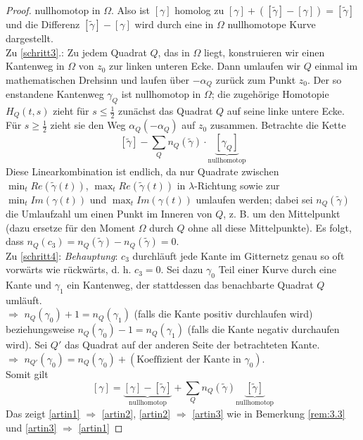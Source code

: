 \documentclass[11pt,titlepage]{article}
\theoremstyle{definition}
\theoremstyle{remark}
\begin{document}
\begin{proof}
		nullhomotop in $\Omega$. Also ist $[\gamma]$ homolog zu $[\gamma]+([\tilde{\gamma}]-[\gamma])= 
		[\tilde{\gamma}]$ und die Differenz $[\tilde{\gamma}]-[\gamma]$ wird durch eine in $\Omega$ 
		nullhomotope Kurve dargestellt. \\
		Zu \ref{schritt3}.: Zu jedem Quadrat $Q$, das in $\Omega$ liegt, konstruieren wir einen Kantenweg in $
		\Omega$ von $z_0$ zur linken unteren Ecke. Dann umlaufen wir $Q$ einmal im mathematischen 
		Drehsinn und laufen über $-\alpha_Q$ zurück zum Punkt $z_0$. Der so enstandene Kantenweg 
		$\gamma_Q$ ist nullhomotop in $\Omega$; die zugehörige Homotopie $H_Q(t,s)$ zieht für 
		$s\leq\frac{1}{2}$ zunächst das Quadrat $Q$ auf seine linke untere Ecke. Für $s\geq \frac{1}{2}$ 
		zieht sie den Weg $\alpha_Q (-\alpha_Q)$ auf $z_0$ zusammen. Betrachte die Kette 
		\[ [\tilde{\gamma}]-\sum_Q n_Q (\tilde{\gamma})\cdot \underbrace{[\gamma_Q]}_{\text{nullhomotop}} \]
		Diese Linearkombination ist endlich, da nur Quadrate zwischen $\min_t Re(\tilde{\gamma}(t))$, 
		$\max_t Re(\tilde{\gamma}(t))$ in $\lambda$-Richtung sowie zur $\min_t Im(\gamma(t))$ und 
		$\max_t Im(\gamma(t))$ umlaufen werden; dabei sei $n_Q(\tilde{\gamma})$ die Umlaufzahl 
		um einen Punkt im Inneren von $Q$, z. B. um den Mittelpunkt (dazu ersetze für den Moment 
		$\Omega$ durch $Q$ ohne all diese Mittelpunkte). Es folgt, dass $n_Q (c_3)=n_Q(\tilde{\gamma})-
		n_Q(\tilde{\gamma})=0$. \\
		Zu \ref{schritt4}: \textsl{Behauptung}: $c_3$ durchläuft jede Kante im Gitternetz genau so oft 
		vorwärts wie rückwärts, d. h. $c_3=0$. Sei dazu $\gamma_0$ Teil einer Kurve durch eine Kante und 
		$\gamma_1$ ein Kantenweg, der stattdessen das benachbarte Quadrat $Q$ umläuft. \\
		$\Rightarrow$ $n_Q(\gamma_0)+1=n_Q(\gamma_1)$ (falls die Kante positiv durchlaufen wird) 
		beziehungsweise $n_Q(\gamma_0)-1=n_Q(\gamma_1)$ (falls die Kante negativ durchaufen wird).
		Sei $Q'$ das Quadrat auf der anderen Seite der betrachteten Kante. \\
		$\Rightarrow$ $n_{Q'}(\gamma_0)=n_Q(\gamma_0)+(\text{Koeffizient der Kante in }\gamma_0)$. \\
		Somit gilt 
		\[ [\gamma]=\underbrace{[\gamma]-[\tilde{\gamma}]}_{\text{nullhomotop}}+\sum_Q n_Q (\tilde{\gamma})
		\underbrace{[\tilde{\gamma}]}_{\text{nullhomotop}} \]
		Das zeigt \ref{artin1} $\Rightarrow$ \ref{artin2}, \ref{artin2} $\Rightarrow$ \ref{artin3} wie in 
		Bemerkung \ref{rem:3.3} und \ref{artin3} $\Rightarrow$ \ref{artin1}
	\end{proof}
\end{document}
